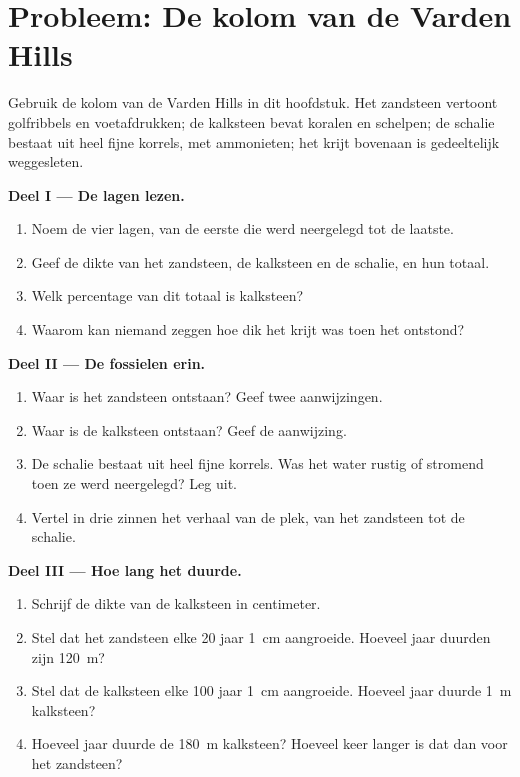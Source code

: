 \section{Probleem: De kolom van de Varden Hills}

\begin{problem}
\label{pb:g7:sediments-and-fossils:1}
Gebruik de kolom van de Varden Hills in dit hoofdstuk. Het zandsteen
vertoont golfribbels en voetafdrukken; de kalksteen bevat koralen en
schelpen; de schalie bestaat uit heel fijne korrels, met ammonieten; het
krijt bovenaan is gedeeltelijk weggesleten.

\medskip
\noindent\textbf{Deel I --- De lagen lezen.}\par\nopagebreak
\begin{enumerate}[beginpenalty=10000]
  \item Noem de vier lagen, van de eerste die werd neergelegd tot de
        laatste.
  \item Geef de dikte van het zandsteen, de kalksteen en de schalie, en hun
        totaal.
  \item Welk percentage van dit totaal is kalksteen?
  \item Waarom kan niemand zeggen hoe dik het krijt was toen het ontstond?
\end{enumerate}

\medskip
\noindent\textbf{Deel II --- De fossielen erin.}\par\nopagebreak
\begin{enumerate}[resume, beginpenalty=10000]
  \item Waar is het zandsteen ontstaan? Geef twee aanwijzingen.
  \item Waar is de kalksteen ontstaan? Geef de aanwijzing.
  \item De schalie bestaat uit heel fijne korrels. Was het water rustig of
        stromend toen ze werd neergelegd? Leg uit.
  \item Vertel in drie zinnen het verhaal van de plek, van het zandsteen
        tot de schalie.
\end{enumerate}

\medskip
\noindent\textbf{Deel III --- Hoe lang het duurde.}\par\nopagebreak
\begin{enumerate}[resume, beginpenalty=10000]
  \item Schrijf de dikte van de kalksteen in centimeter.
  \item Stel dat het zandsteen elke 20 jaar \qty{1}{cm} aangroeide. Hoeveel
        jaar duurden zijn \qty{120}{m}?
  \item Stel dat de kalksteen elke 100 jaar \qty{1}{cm} aangroeide. Hoeveel
        jaar duurde \qty{1}{m} kalksteen?
  \item Hoeveel jaar duurde de \qty{180}{m} kalksteen? Hoeveel keer langer
        is dat dan voor het zandsteen?
\end{enumerate}
\end{problem}
